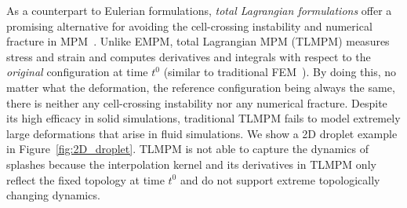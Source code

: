  As a counterpart to Eulerian formulations, \emph{total Lagrangian formulations} offer a promising alternative for avoiding the cell-crossing instability and numerical fracture in MPM~\cite{De:2020:TLMPM,De:2021:TLMPM}. 
 Unlike EMPM, total Lagrangian MPM (TLMPM) measures stress and strain and computes derivatives and integrals with respect to the \emph{original} configuration at time $t^0$ (similar to traditional FEM~\cite{Sifakis:2012:FEM,Zienkiewicz:1977:FEM}). 
 By doing this, no matter what the deformation, the reference configuration being always the same, there is neither any cell-crossing instability nor any numerical fracture. 
 Despite its high efficacy in solid simulations, traditional TLMPM fails to model extremely large deformations that arise in fluid simulations. 
 We show a 2D droplet example in Figure~\ref{fig:2D_droplet}. TLMPM is not able to capture the dynamics of splashes because the interpolation kernel and its derivatives in TLMPM only reflect the fixed topology at time $t^0$ and do not support extreme topologically changing dynamics. 
